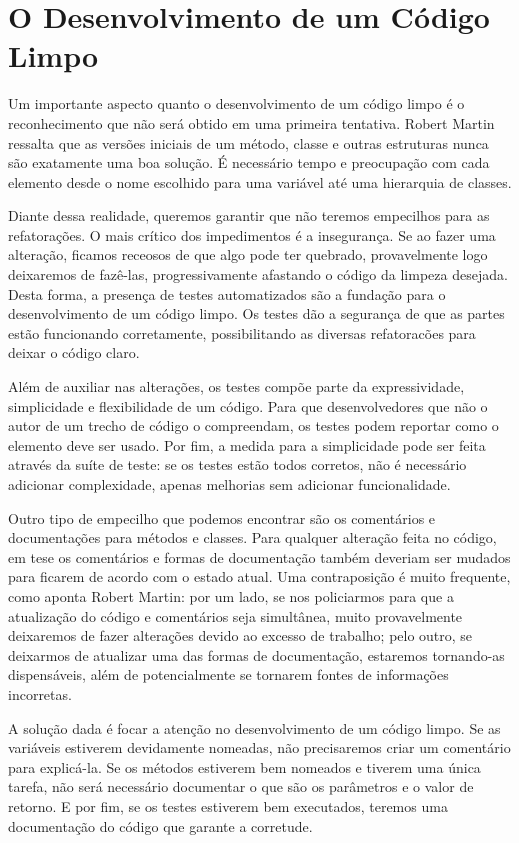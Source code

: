\section{O Desenvolvimento de um Código Limpo} 
Um importante aspecto quanto o desenvolvimento de um código limpo é o reconhecimento que não será obtido em uma primeira tentativa. Robert Martin ressalta que as versões iniciais de um método, classe e outras estruturas nunca são exatamente uma boa solução. É necessário tempo e preocupação com cada elemento desde o nome escolhido para uma variável até uma hierarquia de classes.

Diante dessa realidade, queremos garantir que não teremos empecilhos para as refatorações.
O mais crítico dos impedimentos é a insegurança. Se ao fazer uma alteração, ficamos receosos de que algo pode ter quebrado, provavelmente logo deixaremos de fazê-las, progressivamente afastando o código da limpeza desejada. Desta forma, a presença de testes automatizados são a fundação para o desenvolvimento de um código limpo. Os testes dão a segurança de que as partes estão funcionando corretamente, possibilitando as diversas refatoracões para deixar o código claro.

Além de auxiliar nas alterações, os testes compõe parte da expressividade, simplicidade e flexibilidade de um código. Para que desenvolvedores que não o autor de um trecho de código o compreendam, os testes podem reportar como o elemento deve ser usado. Por fim, a medida para a simplicidade pode ser feita através da suíte de teste: se os testes estão todos corretos, não é necessário adicionar complexidade, apenas melhorias sem adicionar funcionalidade. 

Outro tipo de empecilho que podemos encontrar são os comentários e documentações para métodos e classes. Para qualquer alteração feita no código, em tese os comentários e formas de documentação também deveriam ser mudados para ficarem de acordo com o estado atual. Uma contraposição é muito frequente, como aponta Robert Martin: por um lado, se nos policiarmos para que a atualização do código e comentários seja simultânea, muito provavelmente deixaremos de fazer alterações devido ao excesso de trabalho; pelo outro, se deixarmos de atualizar uma das formas de documentação, estaremos tornando-as dispensáveis, além de potencialmente se tornarem fontes de informações incorretas.

A solução dada é focar a atenção no desenvolvimento de um código limpo. Se as variáveis estiverem devidamente nomeadas, não precisaremos criar um comentário para explicá-la. Se os métodos estiverem bem nomeados e tiverem uma única tarefa, não será necessário documentar o que são os parâmetros e o valor de retorno. E por fim, se os testes estiverem bem executados, teremos uma documentação do código que garante a corretude.

